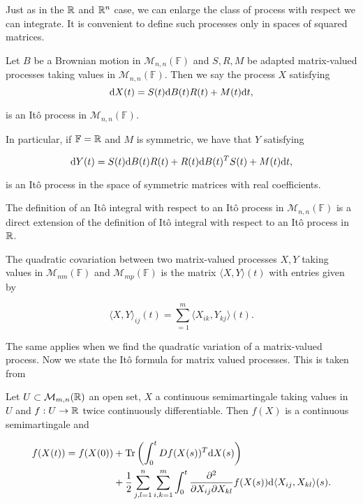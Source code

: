 Just as in the $\mathbb R$ and $\mathbb R^n$ case, we can enlarge the class of process with respect we can integrate. It is convenient to define such processes only in spaces of squared matrices.

\begin{definition}

    Let $B$ be a Brownian motion in $\mathcal M_{n,n}(\mathbb F)$ and $S, R, M$ be  adapted matrix-valued processes taking values in $\mathcal M_{n,n}(\mathbb F)$. Then we say the process $X$ satisfying 
\begin{equation*}
    \mathrm d X(t) = S(t) \mathrm d B(t) R(t) + M(t) \mathrm d t, 
\end{equation*}

    \noindent is an Itô process in $\mathcal M_{n,n}(\mathbb F)$.

    In particular, if $\mathbb F = \mathbb R$ and $M$ is symmetric, we have that $Y$ satisfying

    \begin{equation*}
        \mathrm d Y(t) = S(t) \mathrm d B(t) R(t) + R(t) \mathrm d B(t)^T S(t) + M(t) \mathrm d t,
    \end{equation*}

    \noindent is an Itô process in the space of symmetric matrices with real coefficients.
\end{definition}

    The definition of an Itô integral with respect to an Itô process in $\mathcal M_{n,n}(\mathbb F)$ is a direct extension of the definition of Itô integral with respect to an Itô process in $\mathbb R$. 

The quadratic covariation between two matrix-valued processes $X, Y$ taking values in  $\mathcal M_{nm}(\mathbb F)$ and $\mathcal M_{mp}(\mathbb F)$ is the matrix $\langle X, Y\rangle(t)$ with entries given by

\begin{equation*}
    \langle X, Y \rangle_{ij} (t) = \sum_{=1}^m \langle X_{ik}, Y_{kj} \rangle (t).
\end{equation*}

The same applies when we find the quadratic variation of a matrix-valued process. Now we state the Itô formula for matrix valued processes. This is taken from \cite{thesis_trujillo}

\begin{theorem}
    Let $U \subset \mathcal M_{m,n}(\mathbb R)$ an open set, $X$ a continuous semimartingale taking values in $U$ and $f: U \to \mathbb R$ twice continuously differentiable. Then $f(X)$ is a continuous semimartingale and

    \begin{align*}
        f(X(t)) = f(X(0)) &+ \mathrm{Tr}\left( \int_0^t D f(X(s))^T \mathrm d X(s) \right) \\ 
                &+ \frac12 \sum_{j,l=1}^n \sum_{i,k=1}^m \int_0^t \frac{\partial^2}{\partial X_{ij} \partial X_{kl}} f(X(s)) \mathrm d \langle X_{ij}, X_{kl} \rangle(s).
    \end{align*}
\end{theorem}

